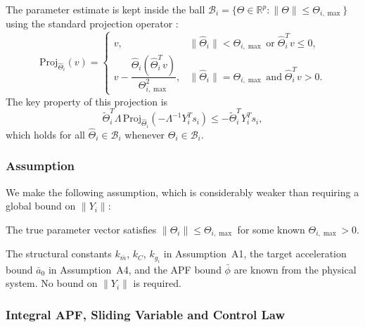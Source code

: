 The parameter estimate is kept inside the ball $\mathcal{B}_i = \{\Theta \in \mathbb{R}^p : \|\Theta\| \le \Theta_{i,\max}\}$ using the standard projection operator \cite{ioannouSunRobustAdaptiveControl1996}:
\begin{equation}\label{eq7:proj}
	\mathrm{Proj}_{\hat{\Theta}_i}(v) =
	\begin{cases}
		v, & \|\hat{\Theta}_i\| < \Theta_{i,\max}
		\;\text{or}\; \hat{\Theta}_i^T v \le 0,\\[2pt]
		v - \dfrac{\hat{\Theta}_i(\hat{\Theta}_i^T v)}{\Theta_{i,\max}^2},
		& \|\hat{\Theta}_i\| = \Theta_{i,\max}
		\;\text{and}\; \hat{\Theta}_i^T v > 0.
	\end{cases}
\end{equation}
The key property of this projection is
\begin{equation}\label{eq7:proj_prop}
	\tilde{\Theta}_i^T \Lambda\,\mathrm{Proj}_{\hat{\Theta}_i}(-\Lambda^{-1}Y_i^T s_i)
	\le -\tilde{\Theta}_i^T Y_i^T s_i,
\end{equation}
which holds for all $\hat{\Theta}_i \in \mathcal{B}_i$ whenever $\Theta_i \in \mathcal{B}_i$.

\subsubsection{Assumption}

We make the following assumption, which is considerably weaker than requiring a global bound
on $\|Y_i\|$:

\begin{assumption}
	The true parameter vector satisfies $\|\Theta_i\| \le \Theta_{i,\max}$ for some known
	$\Theta_{i,\max} > 0$.
\end{assumption}

\noindent The structural constants $k_{\overline m}$, $k_C$, $k_{g_i}$ in Assumption~A1,
the target acceleration bound $\bar{a}_0$ in Assumption~A4, and the APF bound $\bar{\phi}$
are known from the physical system.  No bound on $\|Y_i\|$ is required.

\subsubsection{Integral APF, Sliding Variable and Control Law}

